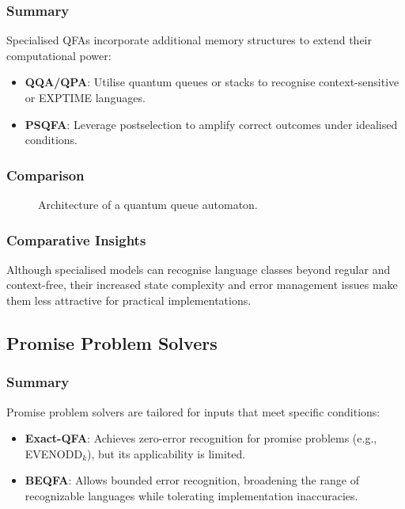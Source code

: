 \subsubsection{Summary}
Specialised QFAs incorporate additional memory structures to extend their computational power:
\begin{itemize}
    \item \textbf{QQA/QPA}: Utilise quantum queues or stacks to recognise context-sensitive or EXPTIME languages.
    \item \textbf{PSQFA}: Leverage postselection to amplify correct outcomes under idealised conditions.
\end{itemize}

\subsubsection{Comparison}
\begin{figure}[ht]
\centering
{}
\caption{Architecture of a quantum queue automaton.}
\label{fig:qqa}
\end{figure}

\subsubsection{Comparative Insights}
Although specialised models can recognise language classes beyond regular and context-free, their increased state complexity and error management issues make them less attractive for practical implementations.

\subsection*{Promise Problem Solvers}

\subsubsection{Summary}
Promise problem solvers are tailored for inputs that meet specific conditions:
\begin{itemize}
    \item \textbf{Exact-QFA}: Achieves zero-error recognition for promise problems (e.g., EVENODD$_k$), but its applicability is limited.
    \item \textbf{BEQFA}: Allows bounded error recognition, broadening the range of recognizable languages while tolerating implementation inaccuracies.
\end{itemize}

